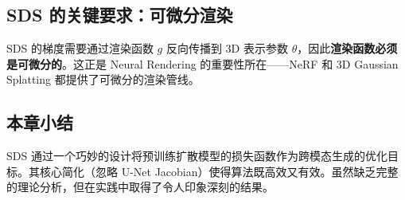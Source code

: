 \subsection{SDS 的关键要求：可微分渲染}

SDS 的梯度需要通过渲染函数 $g$ 反向传播到 3D 表示参数 $\theta$，因此\textbf{渲染函数必须是可微分的}。这正是 Neural Rendering 的重要性所在——NeRF 和 3D Gaussian Splatting 都提供了可微分的渲染管线。

\subsection{本章小结}

SDS 通过一个巧妙的设计将预训练扩散模型的损失函数作为跨模态生成的优化目标。其核心简化（忽略 U-Net Jacobian）使得算法既高效又有效。虽然缺乏完整的理论分析，但在实践中取得了令人印象深刻的结果。

\newpage
